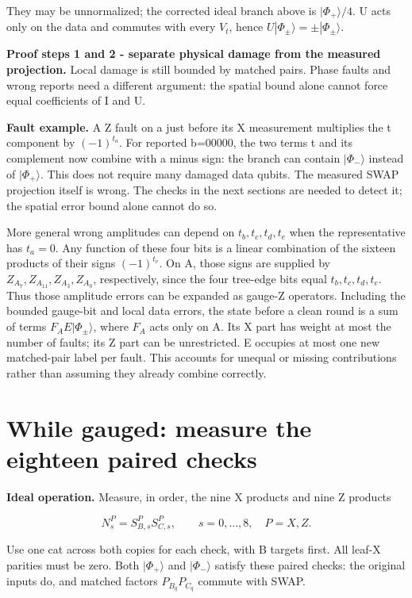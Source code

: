 \documentclass[11pt]{article}
\begin{document}
They may be unnormalized; the corrected ideal branch above is \(|\Phi_+\rangle/4\). U acts only on the data and commutes with every \(V_t\), hence \(U|\Phi_\pm\rangle=\pm|\Phi_\pm\rangle\).

\textbf{Proof steps 1 and 2 - separate physical damage from the measured projection.} Local damage is still bounded by matched pairs. Phase faults and wrong reports need a different argument: the spatial bound alone cannot force equal coefficients of I and U.

\textbf{Fault example.} A Z fault on a just before its X measurement multiplies the t component by \((-1)^{t_a}\). For reported b=00000, the two terms t and its complement now combine with a minus sign: the branch can contain \(|\Phi_-\rangle\) instead of \(|\Phi_+\rangle\). This does not require many damaged data qubits. The measured SWAP projection itself is wrong. The checks in the next sections are needed to detect it; the spatial error bound alone cannot do so.

More general wrong amplitudes can depend on \(t_b,t_c,t_d,t_e\) when the representative has \(t_a=0\). Any function of these four bits is a linear combination of the sixteen products of their signs \((-1)^{t_v}\). On A, those signs are supplied by \(Z_{A_7},Z_{A_{11}},Z_{A_3},Z_{A_0}\), respectively, since the four tree-edge bits equal \(t_b,t_c,t_d,t_e\). Thus those amplitude errors can be expanded as gauge-Z operators. Including the bounded gauge-bit and local data errors, the state before a clean round is a sum of terms \(F_A E|\Phi_\pm\rangle\), where \(F_A\) acts only on A. Its X part has weight at most the number of faults; its Z part can be unrestricted. E occupies at most one new matched-pair label per fault. This accounts for unequal or missing contributions rather than assuming they already combine correctly.

\section{While gauged: measure the eighteen paired checks}
\textbf{Ideal operation.} Measure, in order, the nine X products and nine Z products

\[
N_s^P=S^P_{B,s}S^P_{C,s},\qquad s=0,\ldots,8,\quad P=X,Z.
\]

Use one cat across both copies for each check, with B targets first. All leaf-X parities must be zero. Both \(|\Phi_+\rangle\) and \(|\Phi_-\rangle\) satisfy these paired checks: the original inputs do, and matched factors \(P_{B_q}P_{C_q}\) commute with SWAP.
\end{document}
